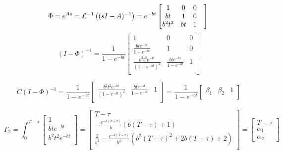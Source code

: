 \documentclass[a4paper]{article}
\begin{document}
\begin{equation}
\Phi = e^{As} = \mathcal{L}^{-1}\left((sI-A)^{-1}\right) = e^{-bt} 
\begin{bmatrix}
1 & 0 & 0 \\ bt & 1 & 0 & \\ b^2t^2 & bt & 1 \\ 
\end{bmatrix}\\
\end{equation}
\begin{equation}
(I-\Phi)^{-1} = \frac{1}{1-e^{-bt}}
\begin{bmatrix}
1 & 0 & 0 \\
\frac{bte^{-bt}}{1-e^{-bt}} & 1 & 0 \\
\frac{b^2t^2e^{-bt}}{(1 - e^{-bt})^2} &\frac{bte^{-bt}}{1-e^{-bt}} & 1 \\
\end{bmatrix} 
\end{equation}

\begin{equation}
C(I-\Phi)^{-1} = \frac{1}{1-e^{-bt}}
\begin{bmatrix}\frac{b^2t^2e^{-bt}}{(1 - e^{-bt})^2} &\frac{bte^{-bt}}{1-e^{-bt}} & 1 \\
\end{bmatrix} = \frac{1}{1-e^{-bt}} \begin{bmatrix}
\beta_1 & \beta_2 & 1\\
\end{bmatrix}
\end{equation}

\begin{equation}
\Gamma_2 = \int_{0}^{T-\tau}
\begin{bmatrix}
1 \\ bte^{-bt} \\ b^2t^2e^{-bt} \\
\end{bmatrix}
= \begin{bmatrix}
T-\tau \\ -\frac{e^{-b(T-\tau)}}{b}\left(b(T-\tau) + 1 \right)\\
\frac{2}{b^2} - \frac{e^{-b(T-\tau)}}{b^2}\left(b^2(T-\tau)^2 + 2b(T-\tau) + 2\right)\\
\end{bmatrix} = \begin{bmatrix}
T-\tau \\ \alpha_1 \\ \alpha_2
\end{bmatrix}
\end{equation}
\end{document}
